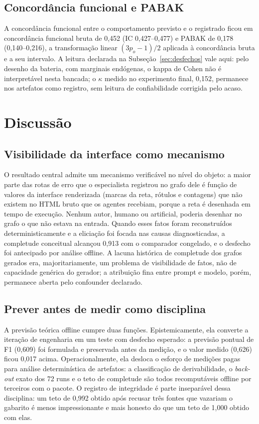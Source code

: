 \documentclass[11pt,a4paper]{article}
\begin{document}
\subsection{Concordância funcional e PABAK}
\label{sec:pabak}

A concordância funcional entre o comportamento previsto e o registrado ficou em concordância funcional bruta de 0,452 (IC 0,427--0,477) e PABAK de 0,178 (0,140--0,216), a transformação linear $(3p_o-1)/2$ aplicada à concordância bruta e a seu intervalo. A leitura declarada na Subseção~\ref{sec:desfechos} vale aqui: pelo desenho da bateria, com marginais endógenas, o kappa de Cohen não é interpretável nesta bancada; o $\kappa$ medido no experimento final, 0,152, permanece nos artefatos como registro, sem leitura de confiabilidade corrigida pelo acaso.

\section{Discussão}
\label{sec:discussao}

\subsection{Visibilidade da interface como mecanismo}

O resultado central admite um mecanismo verificável no nível do objeto: a maior parte das rotas de erro que o especialista registrou no grafo dele é função de valores da interface renderizada (marcas da reta, rótulos e contagens) que não existem no HTML bruto que os agentes recebiam, porque a reta é desenhada em tempo de execução. Nenhum autor, humano ou artificial, poderia desenhar no grafo o que não estava na entrada. Quando esses fatos foram reconstruídos deterministicamente e a eliciação foi focada nas causas diagnosticadas, a completude conceitual alcançou 0,913 com o comparador congelado, e o desfecho foi antecipado por análise offline. A lacuna histórica de completude dos grafos gerados era, majoritariamente, um problema de visibilidade de fatos, não de capacidade genérica do gerador; a atribuição fina entre prompt e modelo, porém, permanece aberta pelo confounder declarado.

\subsection{Prever antes de medir como disciplina}

A previsão teórica offline cumpre duas funções. Epistemicamente, ela converte a iteração de engenharia em um teste com desfecho esperado: a previsão pontual de F1 (0,609) foi formulada e preservada antes da medição, e o valor medido (0,626) ficou 0,017 acima. Operacionalmente, ela desloca o esforço de medições pagas para análise determinística de artefatos: a classificação de derivabilidade, o \emph{back-out} exato dos 72 runs e o teto de completude são todos recomputáveis offline por terceiros com o pacote. O registro de integridade é parte inseparável dessa disciplina: um teto de 0,992 obtido após recusar três fontes que vazariam o gabarito é menos impressionante e mais honesto do que um teto de 1,000 obtido com elas.
\end{document}
